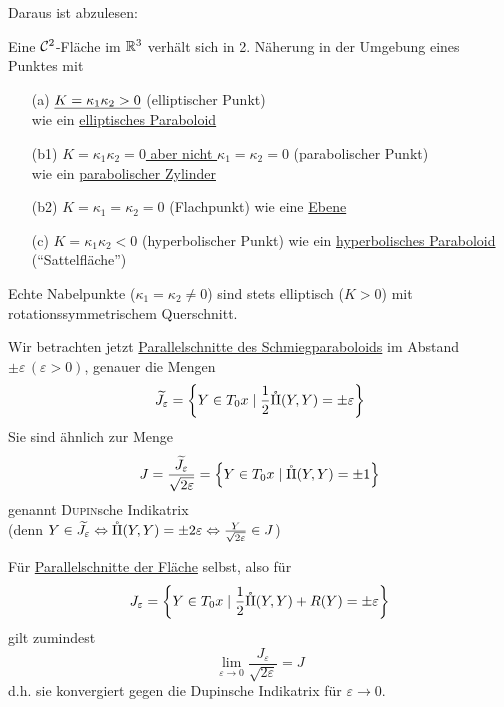 Daraus ist abzulesen:

\begin{satz}\label{satz234}
 Eine \(\mathcal{C}^2\)-Fläche im \(\mathbb{R}^3\) verhält sich in 2. Näherung in der Umgebung eines Punktes mit 
 \begin{enumerate}
  \item[(a)] \(\uline{K = \kappa_1 \kappa_2 > 0}\) (elliptischer Punkt) \\
  wie ein \uline{elliptisches Paraboloid}  
  \item[(b1)] \uline{\(K = \kappa_1 \kappa_2 = 0\) aber nicht \(\kappa_1 = \kappa_2 = 0\)} (parabolischer Punkt) \\
  wie ein \uline{parabolischer Zylinder}
  \item[(b2)] \uline{\(K = \kappa_1 = \kappa_2 = 0\)} (Flachpunkt)
  wie eine \uline{Ebene}
  \item[(c)] \uline{\(K = \kappa_1 \kappa_2 < 0\)} (hyperbolischer Punkt)
  wie ein \uline{hyperbolisches Paraboloid} ("`Sattelfläche"')
 \end{enumerate}
\end{satz}

\begin{bemerkung}
 Echte Nabelpunkte (\(\kappa_1 = \kappa_2 \ne 0\)) sind stets elliptisch (\(K > 0\)) mit rotationssymmetrischem Querschnitt.
\end{bemerkung}

Wir betrachten jetzt \uline{Parallelschnitte des Schmiegparaboloids} im Abstand \(\pm \varepsilon \, (\varepsilon > 0)\), genauer die Mengen
\begin{align*}
 \widetilde J_\varepsilon = \left\{ Y \in T_0 x \mid \frac12 \mathring {\Rom2} (Y,Y) = \pm \varepsilon\right\}
\end{align*}
 Sie sind ähnlich zur Menge
 \[
  J = \frac{\widetilde J_\varepsilon}{\sqrt{2\varepsilon}} = \left\{ Y \in T_0 x \mid \mathring {\Rom2} (Y,Y) = \pm 1\right\}
 \]
 genannt \textsc{Dupin}sche Indikatrix \\
 (denn \(Y \in \widetilde J_\varepsilon \Leftrightarrow \mathring {\Rom2}(Y,Y) = \pm 2\varepsilon \Leftrightarrow \frac{Y}{\sqrt{2\varepsilon}} \in J\)) \par
 Für \uline{Parallelschnitte der Fläche} selbst, also für
 \[
  J_\varepsilon = \left\{ Y \in T_0 x\mid \frac12 \mathring{\Rom2}(Y,Y) + R(Y) = \pm \varepsilon \right\}
 \]
 gilt zumindest
 \[
  \lim_{\varepsilon \to 0} \frac{J_\varepsilon}{\sqrt{2\varepsilon}} = J
 \]
 d.h. sie konvergiert gegen die Dupinsche Indikatrix für \(\varepsilon \to 0\).
 
